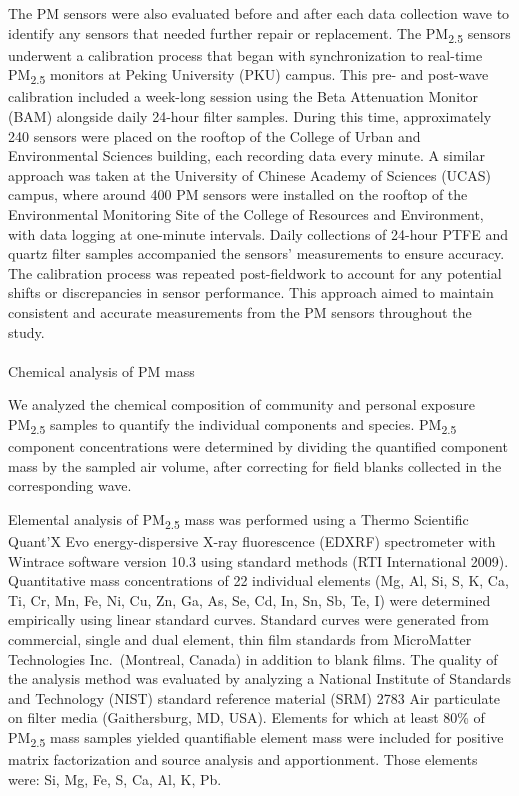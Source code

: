 \documentclass[
  letterpaper,
  DIV=11,
  numbers=noendperiod]{scrartcl}
\makeatletter
\let\oldparagraph\paragraph
\renewcommand{\paragraph}{
    \@ifstar
      \xxxParagraphStar
      \xxxParagraphNoStar
  }
\newcommand{\xxxParagraphStar}[1]{\oldparagraph*{#1}\mbox{}}
\newcommand{\xxxParagraphNoStar}[1]{\oldparagraph{#1}\mbox{}}
\makeatother
\begin{document}
The PM sensors were also evaluated before and after each data collection
wave to identify any sensors that needed further repair or replacement.
The PM\textsubscript{2.5} sensors underwent a calibration process that
began with synchronization to real-time PM\textsubscript{2.5} monitors
at Peking University (PKU) campus. This pre- and post-wave calibration
included a week-long session using the Beta Attenuation Monitor (BAM)
alongside daily 24-hour filter samples. During this time, approximately
240 sensors were placed on the rooftop of the College of Urban and
Environmental Sciences building, each recording data every minute. A
similar approach was taken at the University of Chinese Academy of
Sciences (UCAS) campus, where around 400 PM sensors were installed on
the rooftop of the Environmental Monitoring Site of the College of
Resources and Environment, with data logging at one-minute intervals.
Daily collections of 24-hour PTFE and quartz filter samples accompanied
the sensors' measurements to ensure accuracy. The calibration process
was repeated post-fieldwork to account for any potential shifts or
discrepancies in sensor performance. This approach aimed to maintain
consistent and accurate measurements from the PM sensors throughout the
study.

\paragraph{Chemical analysis of PM
mass}\label{chemical-analysis-of-pm-mass}

We analyzed the chemical composition of community and personal exposure
PM\textsubscript{2.5} samples to quantify the individual components and
species. PM\textsubscript{2.5} component concentrations were determined
by dividing the quantified component mass by the sampled air volume,
after correcting for field blanks collected in the corresponding wave.

Elemental analysis of PM\textsubscript{2.5} mass was performed using a
Thermo Scientific Quant'X Evo energy-dispersive X-ray fluorescence
(EDXRF) spectrometer with Wintrace software version 10.3 using standard
methods (RTI International 2009). Quantitative mass concentrations of 22
individual elements (Mg, Al, Si, S, K, Ca, Ti, Cr, Mn, Fe, Ni, Cu, Zn,
Ga, As, Se, Cd, In, Sn, Sb, Te, I) were determined empirically using
linear standard curves. Standard curves were generated from commercial,
single and dual element, thin film standards from MicroMatter
Technologies Inc.~(Montreal, Canada) in addition to blank films. The
quality of the analysis method was evaluated by analyzing a National
Institute of Standards and Technology (NIST) standard reference material
(SRM) 2783 Air particulate on filter media (Gaithersburg, MD, USA).
Elements for which at least 80\% of PM\textsubscript{2.5} mass samples
yielded quantifiable element mass were included for positive matrix
factorization and source analysis and apportionment. Those elements
were: Si, Mg, Fe, S, Ca, Al, K, Pb.
\end{document}
